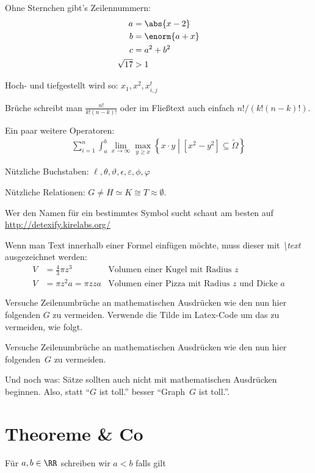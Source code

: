 Ohne Sternchen gibt's Zeilennummern:
\begin{align}
	a &= \abs{x - 2}\\
	b &= \enorm{a + x}\\
	c &= a^2 + b^2 \\
	\sqrt{17} &> 1 \label{eq:wurzel}
\end{align}

Hoch- und tiefgestellt wird so: $x_1, x^2, x_{i,j}^t$

Brüche schreibt man $\frac{n!}{k!(n-k)!}$ oder im Fließtext auch einfach $n!/(k!(n-k)!)$.

Ein paar weitere Operatoren:
\begin{align*}
	\sum_{i=1}^n \int_a^b \lim_{x \to \infty} \max_{y \geq x} \left\{ x \cdot y \middle| \left[ x^2 - y^2 \right] \subseteq \tilde{\Omega} \right\}
\end{align*}

Nützliche Buchstaben: $\ell, \theta, \vartheta, \epsilon, \varepsilon, \phi, \varphi$

Nützliche Relationen: $G \neq H \simeq K \cong T \approx \emptyset$.

Wer den Namen für ein bestimmtes Symbol sucht schaut am besten auf \url{http://detexify.kirelabs.org/}

Wenn man Text innerhalb einer Formel einfügen möchte, muss dieser mit \textit{\textbackslash text} ausgezeichnet werden:
\begin{align*}
	V &= \frac{4}{3} \pi z^3 & \text{Volumen einer Kugel mit Radius $z$}\\
	V &= \pi z^2 a = \pi zza & \text{Volumen einer Pizza mit Radius $z$ und Dicke $a$}
\end{align*}

Versuche Zeilenumbrüche an mathematischen Ausdrücken wie den nun hier folgenden $G$ zu vermeiden. 
Verwende die Tilde im Latex-Code um das zu vermeiden, wie folgt.

Versuche Zeilenumbrüche an mathematischen Ausdrücken wie den nun hier folgenden~$G$ zu vermeiden. 

Und noch was: Sätze sollten auch nicht mit mathematischen Ausdrücken beginnen.
Also, statt \enquote{$G$ ist toll.} besser \enquote{Graph~$G$ ist toll.}.


\section{Theoreme \& Co}


\begin{definition}\label{def:smaller}
	Für $a, b \in \RR$ schreiben wir $a < b$ falls gilt
\end{definition}

